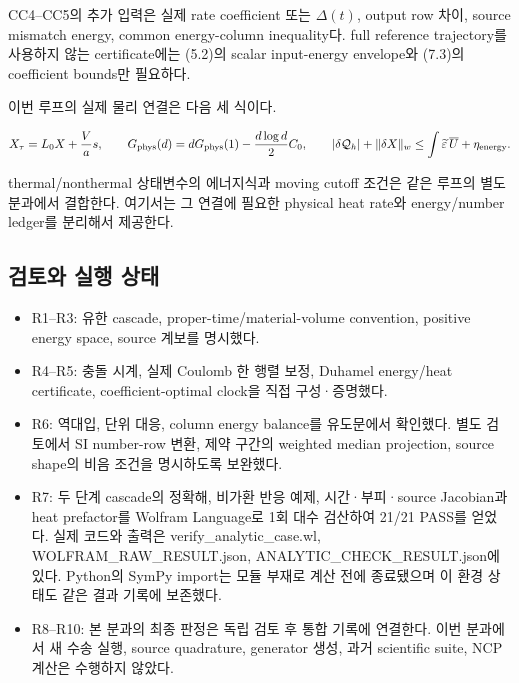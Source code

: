 \documentclass[11pt,a4paper]{article}
\providecommand{\tightlist}{\setlength{\itemsep}{2pt}\setlength{\parskip}{0pt}}
\begin{document}
CC4--CC5의 추가 입력은 실제 rate coefficient 또는 \(\Delta(t)\), output row 차이, source mismatch energy, common energy-column inequality다. full reference trajectory를 사용하지 않는 certificate에는 (5.2)의 scalar input-energy envelope와 (7.3)의 coefficient bounds만 필요하다.

이번 루프의 실제 물리 연결은 다음 세 식이다.

\[
X_\tau=L_0X+\frac Va s,\qquad
G_{\rm phys}(d)=dG_{\rm phys}(1)-\frac{d\log d}{2}C_0,\qquad
|\delta\mathcal Q_h|+\|\delta X\|_w
\le\int\widetilde\varepsilon\,\overline U+\eta_{\rm energy}.
\]

thermal/nonthermal 상태변수의 에너지식과 moving cutoff 조건은 같은 루프의 별도 분과에서 결합한다. 여기서는 그 연결에 필요한 physical heat rate와 energy/number ledger를 분리해서 제공한다.

\hypertarget{uxac80uxd1a0uxc640-uxc2e4uxd589-uxc0c1uxd0dc}{%
\subsection{검토와 실행 상태}\label{uxac80uxd1a0uxc640-uxc2e4uxd589-uxc0c1uxd0dc}}

\begin{itemize}
\tightlist
\item
  R1--R3: 유한 cascade, proper-time/material-volume convention, positive energy space, source 계보를 명시했다.
\item
  R4--R5: 충돌 시계, 실제 Coulomb 한 행렬 보정, Duhamel energy/heat certificate, coefficient-optimal clock을 직접 구성·증명했다.
\item
  R6: 역대입, 단위 대응, column energy balance를 유도문에서 확인했다. 별도 검토에서 SI number-row 변환, 제약 구간의 weighted median projection, source shape의 비음 조건을 명시하도록 보완했다.
\item
  R7: 두 단계 cascade의 정확해, 비가환 반응 예제, 시간·부피·source Jacobian과 heat prefactor를 Wolfram Language로 1회 대수 검산하여 21/21 PASS를 얻었다. 실제 코드와 출력은 verify\_analytic\_case.wl, WOLFRAM\_RAW\_RESULT.json, ANALYTIC\_CHECK\_RESULT.json에 있다. Python의 SymPy import는 모듈 부재로 계산 전에 종료됐으며 이 환경 상태도 같은 결과 기록에 보존했다.
\item
  R8--R10: 본 분과의 최종 판정은 독립 검토 후 통합 기록에 연결한다. 이번 분과에서 새 수송 실행, source quadrature, generator 생성, 과거 scientific suite, NCP 계산은 수행하지 않았다.
\end{itemize}

\clearpage
\end{document}
